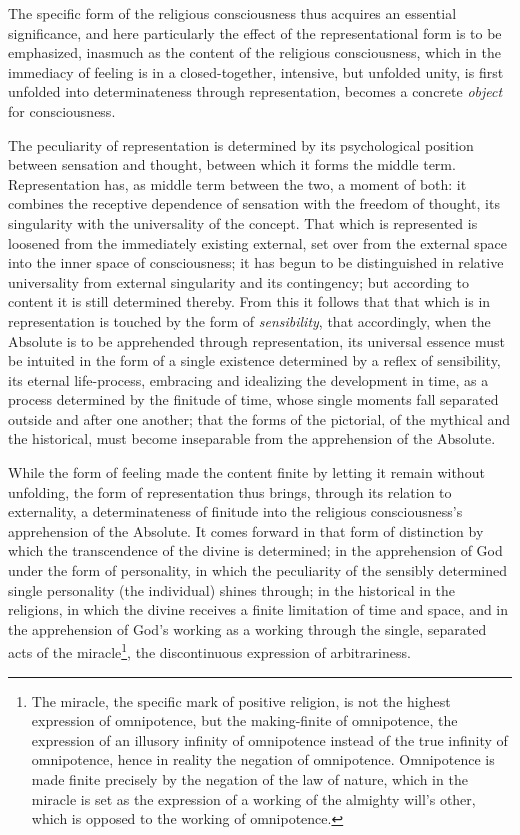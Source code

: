 \documentclass[12pt,a4paper]{book}
\begin{document}
The specific form of the religious consciousness thus acquires an essential
significance, and here particularly the effect of the representational form is
to be emphasized, inasmuch as the content of the religious consciousness, which
in the immediacy of feeling is in a closed-together, intensive, but unfolded
unity, is first unfolded into determinateness through representation, becomes a
concrete \emph{object} for consciousness.

The peculiarity of representation is determined by its psychological position
between sensation and thought, between which it forms the middle term.
Representation has, as middle term between the two, a moment of both: it combines
the receptive dependence of sensation with the freedom of thought, its
singularity with the universality of the concept. That which is represented is
loosened from the immediately existing external, set over from the external space
into the inner space of consciousness; it has begun to be distinguished in
relative universality from external singularity and its contingency; but
according to content it is still determined thereby. From this it follows that
that which is in representation is touched by the form of \emph{sensibility}, that
accordingly, when the Absolute is to be apprehended through representation, its
universal essence must be intuited in the form of a single existence determined
by a reflex of sensibility, its eternal life-process, embracing and idealizing
the development in time, as a process determined by the finitude of time, whose
single moments fall separated outside and after one another; that the forms of
the pictorial, of the mythical and the historical, must become inseparable from
the apprehension of the Absolute.

While the form of feeling made the content finite by letting it remain without
unfolding, the form of representation thus brings, through its relation to
externality, a determinateness of finitude into the religious consciousness's
apprehension of the Absolute. It comes forward in that form of distinction by
which the transcendence of the divine is determined; in the apprehension of God
under the form of personality, in which the peculiarity of the sensibly
determined single personality (the individual) shines through; in the historical
in the religions, in which the divine receives a finite limitation of time and
space, and in the apprehension of God's working as a working through the single,
separated acts of the miracle\footnote{The miracle, the specific mark of positive
religion, is not the highest expression of omnipotence, but the making-finite of
omnipotence, the expression of an illusory infinity of omnipotence instead of the
true infinity of omnipotence, hence in reality the negation of omnipotence.
Omnipotence is made finite precisely by the negation of the law of nature, which
in the miracle is set as the expression of a working of the almighty will's
other, which is opposed to the working of omnipotence.}, the discontinuous
expression of arbitrariness.
\end{document}
